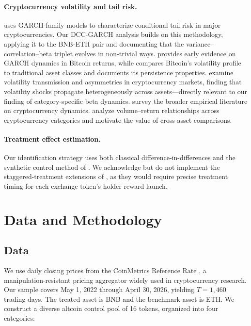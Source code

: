 \documentclass[11pt,a4paper]{article}
\begin{document}
\paragraph{Cryptocurrency volatility and tail risk.} \citet{borri2019} uses GARCH-family models to characterize conditional tail risk in major cryptocurrencies. Our DCC-GARCH analysis builds on this methodology, applying it to the BNB-ETH pair and documenting that the variance--correlation--beta triplet evolves in non-trivial ways. \citet{dyhrberg2016} provides early evidence on GARCH dynamics in Bitcoin returns, while \citet{baur2018} compares Bitcoin's volatility profile to traditional asset classes and documents its persistence properties. \citet{baurdimpfl2021} examine volatility transmission and asymmetries in cryptocurrency markets, finding that volatility shocks propagate heterogeneously across assets---directly relevant to our finding of category-specific beta dynamics. \citet{corbet2018} survey the broader empirical literature on cryptocurrency dynamics. \citet{yarovaya2022} analyze volume--return relationships across cryptocurrency categories and motivate the value of cross-asset comparisons.

\paragraph{Treatment effect estimation.} Our identification strategy uses both classical difference-in-differences and the synthetic control method of \citet{abadie2010}. We acknowledge but do not implement the staggered-treatment extensions of \citet{callaway2021}, as they would require precise treatment timing for each exchange token's holder-reward launch.

\section{Data and Methodology} \label{sec:data}

\subsection{Data}

We use daily closing prices from the CoinMetrics Reference Rate \citep{coinmetrics}, a manipulation-resistant pricing aggregator widely used in cryptocurrency research. Our sample covers May 1, 2022 through April 30, 2026, yielding $T=1{,}460$ trading days. The treated asset is BNB and the benchmark asset is ETH. We construct a diverse altcoin control pool of 16 tokens, organized into four categories:
\end{document}
